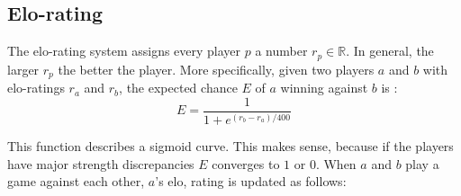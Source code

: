 \documentclass[12pt]{article}
\begin{document}
\subsection{Elo-rating} \label{sec:Evaluation:elo-rating}
The elo-rating system assigns every player \(p\) a number \(r_p \in \mathbb{R}\). In general, the larger \(r_p\) the better the player. More specifically, given two players \(a\) and \(b\) with elo-ratings \(r_a\) and \(r_b\), the expected chance \(E\) of \(a\) winning against \(b\) is \cite{silver2018general}:
\begin{equation} \label{eq:elo_pred}
E = \frac{1}{1 + e^{(r_b-r_a)/400}}
\end{equation}
\begin{center}

\end{center}
This function describes a sigmoid curve. This makes sense, because if the players have major strength discrepancies \(E\) converges to \(1\) or \(0\). When \(a\) and \(b\) play a game against each other, \(a\)'s elo, rating is updated as follows\cite{elo1978rating}:
\end{document}
